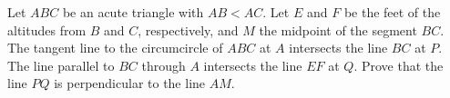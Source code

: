 Let $ABC$ be an acute triangle with $AB<AC$.
Let $E$ and $F$ be the feet of the altitudes from $B$ and $C$, respectively,
and $M$ the midpoint of the segment $BC$.
The tangent line to the circumcircle of $ABC$ at $A$ intersects the line $BC$ at $P$.
The line parallel to $BC$ through $A$ intersects the line $EF$ at $Q$.
Prove that the line $PQ$ is perpendicular to the line $AM$.
